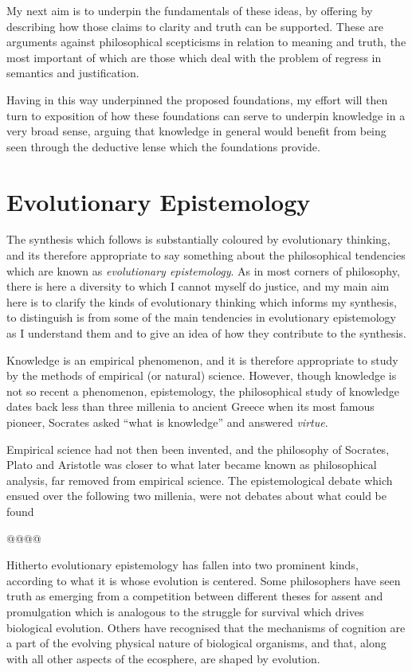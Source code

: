\documentclass[10pt,titlepage]{book}
\begin{document}
My next aim is to underpin the fundamentals of these ideas, by offering by describing how those claims to clarity and truth can be supported.
These are arguments against philosophical scepticisms in relation to meaning and truth, the most important of which are those which deal with the problem of regress in semantics and justification.

Having in this way underpinned the proposed foundations, my effort will then turn to exposition of how these foundations can serve to underpin knowledge in a very broad sense, arguing that knowledge in general would benefit from being seen through the deductive lense which the foundations provide.

\section{Evolutionary Epistemology}

The synthesis which follows is substantially coloured by evolutionary thinking, and its therefore appropriate to say something about the philosophical tendencies which are known as \emph{evolutionary epistemology}.
As in most corners of philosophy, there is here a diversity to which I cannot myself do justice, and my main aim here is to clarify the kinds of evolutionary thinking which informs my synthesis, to distinguish is from some of the main tendencies in evolutionary epistemology as I understand them and to give an idea of how they contribute to the synthesis.

Knowledge is an empirical phenomenon, and it is therefore appropriate to study by the methods of empirical (or natural) science.
However, though knowledge is not so recent a phenomenon, epistemology, the philosophical study of knowledge dates back less than three millenia to ancient Greece when its most famous pioneer, Socrates asked ``what is knowledge'' and answered \emph{virtue}.

Empirical science had not then been invented, and the philosophy of Socrates, Plato and Aristotle was closer to what later became known as philosophical analysis, far removed from empirical science.
The epistemological debate which ensued over the following two millenia, were not debates about what could be found 

@@@@

Hitherto evolutionary epistemology has fallen into two prominent kinds, according to what it is whose evolution is centered.
Some philosophers have seen truth as emerging from a competition between different theses for assent and promulgation which is analogous to the struggle for survival which drives biological evolution.
Others have recognised that the mechanisms of cognition are a part of the evolving physical nature of biological organisms, and that, along with all other aspects of the ecosphere, are shaped by evolution.
\end{document}
